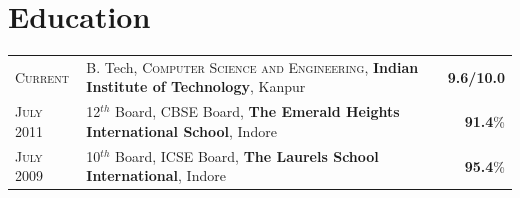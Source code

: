 \documentclass[a4paper]{article} %
\newcommand{\highlight}[2]{%
    \begin{tabular}{p{2.4cm}|l}
        \textsc {\large #1} & #2
    \end{tabular}
}
\begin{document}
%
%


\section{Education}
\def\arraystretch{1.2}
\begin{tabular}{>{\raggedleft}p{1.5cm}p{14.6cm}r}

    \textsc{Current} & B. Tech, \textsc{Computer Science and Engineering},
    \textbf{Indian Institute of Technology}, Kanpur
    & \textbf{9.6/10.0}\\

    \textsc{July 2011} & 12$^{th}$ Board, \textsc{CBSE} Board,
    \textbf{The Emerald Heights International School}, Indore
    & \textbf{91.4}\% \\

    \textsc{July 2009} & 10$^{th}$ Board, \textsc{ICSE} Board,
    \textbf{The Laurels School International}, Indore
    & \textbf{95.4}\% \\

\end{tabular}
\def\arraystretch{1}



\end{document}
